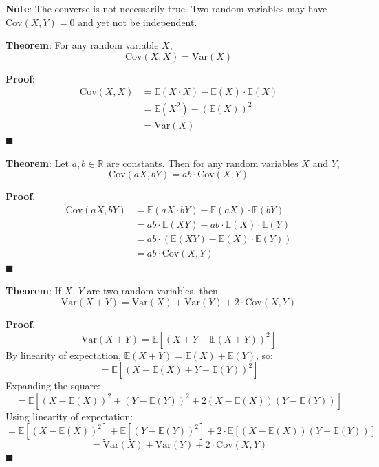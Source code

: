 \documentclass[twoside]{book}
\begin{document}
\textbf{Note}: The converse is not necessarily true. Two random variables may have \( \mathrm{Cov}(X, Y) = 0 \) and yet not be independent.

\begin{textbox}
\textbf{Theorem}: For any random variable \( X \),
\[
\mathrm{Cov}(X, X) = \mathrm{Var}(X)
\]
\end{textbox}

\textbf{Proof}:
\begin{align*}
\mathrm{Cov}(X, X) &= \mathbb{E}(X \cdot X) - \mathbb{E}(X)\cdot \mathbb{E}(X) \\
&= \mathbb{E}(X^2) - (\mathbb{E}(X))^2 \\
&= \mathrm{Var}(X)
\end{align*}
\hfill\(\blacksquare\)

\begin{textbox}
\textbf{Theorem}: Let \( a, b \in \mathbb{R} \) are constants. Then for any random variables \( X \) and \( Y \),
\[
\mathrm{Cov}(aX, bY) = ab \cdot \mathrm{Cov}(X, Y)
\]
\end{textbox}

\textbf{Proof.}
\begin{align*}
\mathrm{Cov}(aX, bY) &= \mathbb{E}(aX \cdot bY) - \mathbb{E}(aX)\cdot \mathbb{E}(bY) \\
&= ab \cdot \mathbb{E}(XY) - ab \cdot \mathbb{E}(X)\cdot \mathbb{E}(Y) \\
&= ab \cdot \left( \mathbb{E}(XY) - \mathbb{E}(X)\cdot \mathbb{E}(Y) \right) \\
&= ab \cdot \mathrm{Cov}(X, Y)
\end{align*}
\hfill\(\blacksquare\)

\begin{textbox}
\textbf{Theorem}: If $X$, $Y$ are two random variables, then
\[
\mathrm{Var}(X+Y) = \mathrm{Var}(X) + \mathrm{Var}(Y) + 2 \cdot \mathrm{Cov}(X, Y)
\]
\end{textbox}

\textbf{Proof.}
\[
\mathrm{Var}(X + Y) = \mathbb{E}[(X + Y - \mathbb{E}(X + Y))^2]
\]
By linearity of expectation, \( \mathbb{E}(X + Y) = \mathbb{E}(X) + \mathbb{E}(Y) \), so:
\[
= \mathbb{E}[(X - \mathbb{E}(X) + Y - \mathbb{E}(Y))^2]
\]
Expanding the square:
\[
= \mathbb{E}[(X - \mathbb{E}(X))^2 + (Y - \mathbb{E}(Y))^2 + 2(X - \mathbb{E}(X))(Y - \mathbb{E}(Y))]
\]
Using linearity of expectation:
\[
= \mathbb{E}[(X - \mathbb{E}(X))^2] + \mathbb{E}[(Y - \mathbb{E}(Y))^2] + 2 \cdot \mathbb{E}[(X - \mathbb{E}(X))(Y - \mathbb{E}(Y))]
\]
\[
= \mathrm{Var}(X) + \mathrm{Var}(Y) + 2 \cdot \mathrm{Cov}(X, Y)
\]
\hfill\(\blacksquare\)
\end{document}

